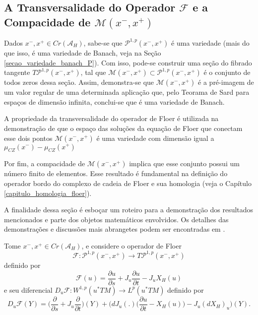\documentclass[12pt]{book}
\newcommand{\bigparenteses}[1]{\Big( #1 \Big) }
\newcommand{\caminhosexponenciaisconectantes}[2]{\mathcal{P}^{1,p}(#1, #2)}
\newcommand{\caminhosexponenciaisconectantespadrao}{\caminhosexponenciaisconectantes{x^{-}}{x^{+}}}
\newcommand{\diferencialfloerponto}[1]{D_{#1}\operadorFloer}
\newcommand{\derivadaparcial}[2]{\frac{\partial #1}{\partial #2}}
\newcommand{\diferencialhamiltoniano}[1]{(dX_{H})_{#1}}
\newcommand{\energiafinitaM}{\mathcal{M}}
\newcommand{\energiafinitaMconectante}{\energiafinitaM(x^{-}, x^{+})}
\newcommand{\espacoLp}[1]{L^{p}(#1)}
\newcommand{\espacosobolev}[1]{W^{1,p}(#1)}
\newcommand{\funcionalH}{\mathcal{A}_{H}}
\newcommand{\iconley}[1]{\iconleyabrev(#1)}
\newcommand{\iconleyabrev}{\mu_{CZ}}
\newcommand{\operadorFloer}{\mathcal{F}}
\newcommand{\operadorFloerDefinicao}[1]{\derivadaparcial{#1}{s} + J_{#1}\derivadaparcial{#1}{t} - J_{#1}X_{H}(#1)}
\newcommand{\operadorFloerParametro}[1]{\mathcal{F}(#1)}
\newcommand{\pontoscriticos}[1]{\textit{Cr}(#1)}
\newcommand{\pullbackfibradotangente}[2]{#1^{*}T#2}
\newcommand{\pullbackfibradotangenteM}[1]{\pullbackfibradotangente{#1}{M}}
\begin{document}
	\subsection{A Transversalidade do Operador $\operadorFloer$ e a Compacidade de $\energiafinitaMconectante$}\label{secao_transversalidade_compacidade_M}
	
	Dados $x^{-}, x^{+}\in \pontoscriticos{\funcionalH}$, sabe-se que $\caminhosexponenciaisconectantespadrao$ é uma variedade (mais do que isso, é uma variedade de Banach, veja na Seção \ref{secao_variedade_banach_P}). Com isso, pode-se construir uma seção do fibrado tangente $T\caminhosexponenciaisconectantespadrao$, tal que $\energiafinitaMconectante\subset \caminhosexponenciaisconectantespadrao$ é o conjunto de todos zeros dessa seção. Assim, demonstra-se que $\energiafinitaMconectante$ é a pré-imagem de um valor regular de uma determinada aplicação que, pelo Teorama de Sard para espaços de dimensão infinita, conclui-se que é uma variedade de Banach.
	
	A propriedade da transversalidade do operador de Floer é utilizada na demonstração de que o espaço das soluções da equação de Floer que conectam esse dois pontos $\energiafinitaMconectante$ é uma variedade com dimensão igual a $\iconley{x^{-}}-\iconley{x^{+}}$ 
	
	Por fim, a compacidade de $\energiafinitaMconectante$ implica que esse conjunto possui um número finito de elementos. Esse resultado é fundamental na definição do operador bordo do complexo de cadeia de Floer e sua homologia (veja o Capítulo \ref{capitulo_homologia_floer}).
	
	A finalidade dessa seção é esboçar um roteiro para a demonstração dos resultados mencionados e parte dos objetos matemáticos envolvidos. Os detalhes das demonstrações e discussões mais abrangetes podem ser encontradas em \cite{audi_floer_homology}.
	
	Tome $x^{-},x^{+}\in \pontoscriticos{\funcionalH}$, e considere o operador de Floer 
	$$
	\operadorFloer: \caminhosexponenciaisconectantespadrao \to T\caminhosexponenciaisconectantespadrao
	$$  
	definido por
	$$
	\operadorFloerParametro{u} =\operadorFloerDefinicao{u}
	$$
	e seu diferencial $\diferencialfloerponto{u}: \espacosobolev{\pullbackfibradotangenteM{u}} \to \espacoLp{\pullbackfibradotangenteM{u}}$ definido por
	$$
	\diferencialfloerponto{u}(Y)= \Big( \derivadaparcial{}{s} + J_{u}\derivadaparcial {}{t}\Big)(Y)+ \Big(dJ_{u}(.)\bigparenteses{\derivadaparcial{u}{t} - X_{H}(u)} - J_{u} \diferencialhamiltoniano{u}\Big)(Y).
	$$
	
\end{document}
